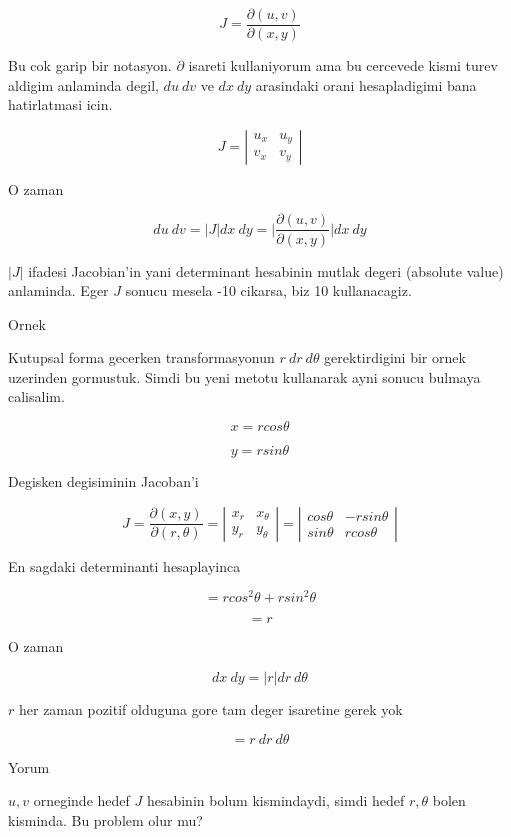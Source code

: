 \documentclass[12pt,fleqn]{article}\usepackage{../common}
\begin{document}
\[ J = \frac{\partial (u,v)}{\partial(x,y)} \]

Bu cok garip bir notasyon. $\partial$ isareti kullaniyorum ama bu cercevede
kismi turev aldigim anlaminda degil, $du \ dv$ ve $dx \ dy$ arasindaki
orani hesapladigimi bana hatirlatmasi icin. 

\[ J =  \left|\begin{array}{rr}
u_x & u_y \\
v_x & v_y
\end{array}\right|
\]

O zaman 

\[ du \ dv = 
|J| dx \ dy = 
\bigg|\frac{\partial (u,v)}{\partial(x,y)}\bigg| dx \ dy
 \]

$|J|$ ifadesi Jacobian'in yani determinant hesabinin mutlak degeri (absolute
value) anlaminda. Eger $J$ sonucu mesela -10 cikarsa, biz 10 kullanacagiz. 

Ornek 

Kutupsal forma gecerken transformasyonun $r \ dr \ d\theta$ gerektirdigini
bir ornek uzerinden gormustuk. Simdi bu yeni metotu kullanarak ayni sonucu
bulmaya calisalim. 

\[  x= r cos\theta \]

\[  y= r sin\theta \]

Degisken degisiminin Jacoban'i

\[ J = \frac{\partial (x,y)}{\partial(r,\theta)}  =
\left|\begin{array}{rr}
x_r & x_\theta \\
y_r & y_\theta
\end{array}\right|   =
\left|\begin{array}{rr}
cos\theta & -rsin\theta\\
sin\theta & rcos\theta
\end{array}\right|
\]

En sagdaki determinanti hesaplayinca

\[ = rcos^2\theta + rsin^2\theta \]

\[ = r \]

O zaman 

\[ dx \ dy = |r| dr \ d\theta \]

$r$ her zaman pozitif olduguna gore tam deger isaretine gerek yok

\[ = r \ dr \ d\theta\]

Yorum 

$u,v$ orneginde hedef $J$ hesabinin bolum kismindaydi, simdi hedef
$r,\theta$ bolen kisminda. Bu problem olur mu? 
\end{document}
